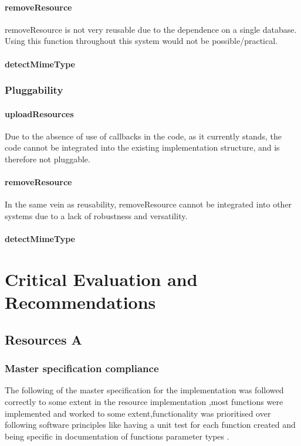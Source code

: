 \documentclass[a4paper]{article}
\begin{document}
\paragraph{removeResource}
removeResource is not very reusable due to the dependence on a single database. Using this function throughout this system would not be possible/practical.

\paragraph{detectMimeType}

\subsubsection {Pluggability}

\paragraph{uploadResources}
Due to the absence of use of callbacks in the code, as it currently stands, the code cannot be integrated into the existing implementation structure, and is therefore not pluggable.

\paragraph{removeResource}
In the same vein as reusability, removeResource cannot be integrated into other systems due to a lack of robustness and versatility.

\paragraph{detectMimeType}


\section {Critical Evaluation and Recommendations}
\subsection {Resources A}
\subsubsection {Master specification compliance}
The following of the master specification for the implementation was followed correctly to some extent in the resource implementation ,most functions were implemented and worked to some extent,functionality was prioritised over following software principles like having a unit test for each function created and being specific in documentation of functions parameter types .
\end{document}
